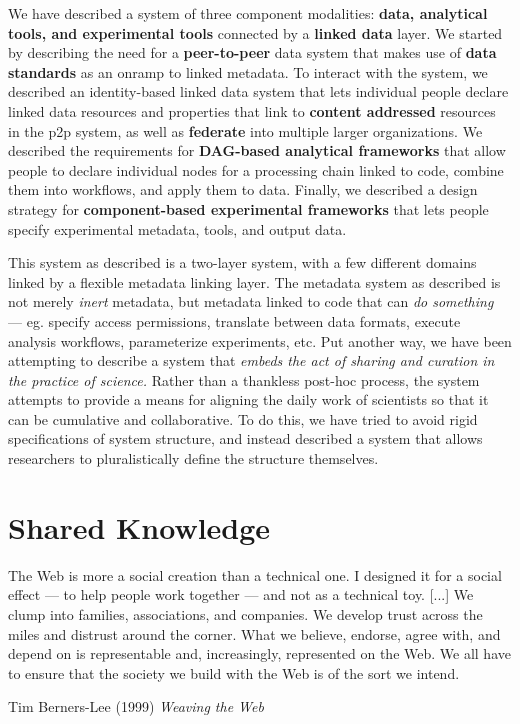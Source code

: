 We have described a system of three component modalities: \textbf{data,
analytical tools, and experimental tools} connected by a \textbf{linked
data} layer. We started by describing the need for a
\textbf{peer-to-peer} data system that makes use of \textbf{data
standards} as an onramp to linked metadata. To interact with the system,
we described an identity-based linked data system that lets individual
people declare linked data resources and properties that link to
\textbf{content addressed} resources in the p2p system, as well as
\textbf{federate} into multiple larger organizations. We described the
requirements for \textbf{DAG-based analytical frameworks} that allow
people to declare individual nodes for a processing chain linked to
code, combine them into workflows, and apply them to data. Finally, we
described a design strategy for \textbf{component-based experimental
frameworks} that lets people specify experimental metadata, tools, and
output data.

This system as described is a two-layer system, with a few different
domains linked by a flexible metadata linking layer. The metadata system
as described is not merely \emph{inert} metadata, but metadata linked to
code that can \emph{do something} --- eg. specify access permissions,
translate between data formats, execute analysis workflows, parameterize
experiments, etc. Put another way, we have been attempting to describe a
system that \emph{embeds the act of sharing and curation in the practice
of science.} Rather than a thankless post-hoc process, the system
attempts to provide a means for aligning the daily work of scientists so
that it can be cumulative and collaborative. To do this, we have tried
to avoid rigid specifications of system structure, and instead described
a system that allows researchers to pluralistically define the structure
themselves.

\hypertarget{shared-knowledge}{%
\section{Shared Knowledge}\label{shared-knowledge}}

\begin{leftbar}
The Web is more a social creation than a technical one. I designed it for a social effect --- to help people work together --- and not as a technical toy. [...] We clump into families, associations, and companies. We develop trust across the miles and distrust around the corner. What we believe, endorse, agree with, and depend on is representable and, increasingly, represented on the Web. We all have to ensure that the society we build with the Web is of the sort we intend.

Tim Berners-Lee (1999) \textit{Weaving the Web} \citep{berners-leeWeavingWebOriginal1999}
\end{leftbar}

